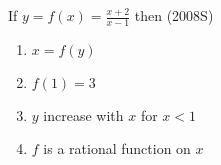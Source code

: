 \iffalse
\title{10. Functions}
\author{Mohit - EE24BTECH11041}
\section{mcq-multiple}
\fi
\item If $y=f(x)=\frac{x+2}{x-1}$ then
\hfill(2008S)
\begin{enumerate}
    \item $x=f(y)$
    \item $f(1)=3$
    \item $y$ increase with $x$ for $x<1$
    \item $f$ is a rational function on $x$
\end{enumerate}
